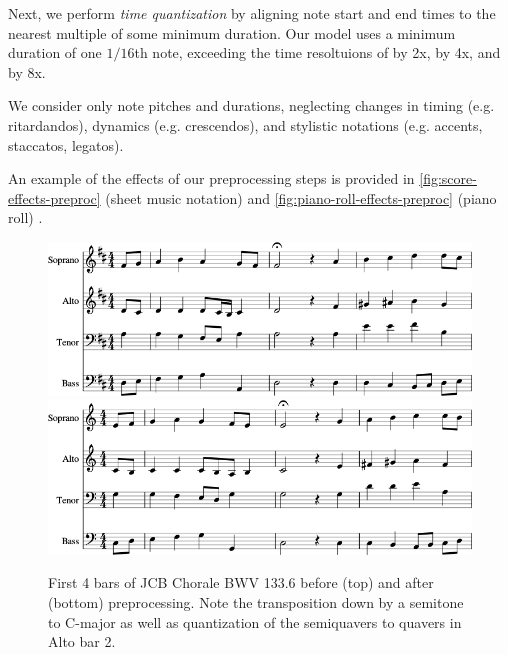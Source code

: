 \documentclass[dissertation.tex]{subfiles}
\begin{document}
Next, we perform \emph{time quantization} by aligning note start and end times
to the nearest multiple of some minimum duration. Our model uses a minimum
duration of one $1/16$th note, exceeding the time resoltuions of
\cite{Boulanger-Lewandowski2012} \cite{Eck2002} by 2x, \cite{hild1991harmonet}
by 4x, and \cite{bellgard1994harmonizing} by 8x.

We consider only note pitches and durations, neglecting changes in timing
(e.g. ritardandos), dynamics (e.g. crescendos), and stylistic notations (e.g.
accents, staccatos, legatos).

An example of the effects of our preprocessing steps is provided in
\autoref{fig:score-effects-preproc} (sheet music notation) and
\autoref{fig:piano-roll-effects-preproc} (piano roll) .

\begin{figure}[htbp]
    \centering
    \includegraphics[width=0.8\linewidth]{Figures/bwv133-6-original-score-1.png}
    \includegraphics[width=0.8\linewidth]{Figures/bwv133-6-preproc-score-1.png}
    \caption{First 4 bars of JCB Chorale BWV 133.6 before (top) and after (bottom) preprocessing. Note
    the transposition down by a semitone to C-major as well as quantization of the
    semiquavers to quavers in Alto bar 2.}
    \label{fig:score-effects-preproc}
\end{figure}
\end{document}
